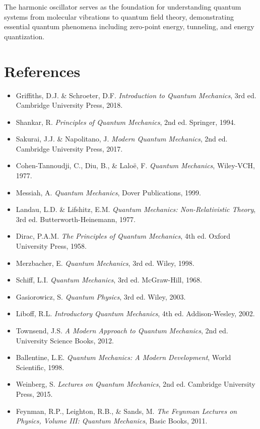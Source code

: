 \documentclass[a4paper, 11pt]{article}
\begin{document}
The harmonic oscillator serves as the foundation for understanding quantum systems from
molecular vibrations to quantum field theory, demonstrating essential quantum phenomena
including zero-point energy, tunneling, and energy quantization.

\section*{References}

\begin{itemize}
\item Griffiths, D.J. \& Schroeter, D.F. \textit{Introduction to Quantum Mechanics}, 3rd ed. Cambridge University Press, 2018.
\item Shankar, R. \textit{Principles of Quantum Mechanics}, 2nd ed. Springer, 1994.
\item Sakurai, J.J. \& Napolitano, J. \textit{Modern Quantum Mechanics}, 2nd ed. Cambridge University Press, 2017.
\item Cohen-Tannoudji, C., Diu, B., \& Laloë, F. \textit{Quantum Mechanics}, Wiley-VCH, 1977.
\item Messiah, A. \textit{Quantum Mechanics}, Dover Publications, 1999.
\item Landau, L.D. \& Lifshitz, E.M. \textit{Quantum Mechanics: Non-Relativistic Theory}, 3rd ed. Butterworth-Heinemann, 1977.
\item Dirac, P.A.M. \textit{The Principles of Quantum Mechanics}, 4th ed. Oxford University Press, 1958.
\item Merzbacher, E. \textit{Quantum Mechanics}, 3rd ed. Wiley, 1998.
\item Schiff, L.I. \textit{Quantum Mechanics}, 3rd ed. McGraw-Hill, 1968.
\item Gasiorowicz, S. \textit{Quantum Physics}, 3rd ed. Wiley, 2003.
\item Liboff, R.L. \textit{Introductory Quantum Mechanics}, 4th ed. Addison-Wesley, 2002.
\item Townsend, J.S. \textit{A Modern Approach to Quantum Mechanics}, 2nd ed. University Science Books, 2012.
\item Ballentine, L.E. \textit{Quantum Mechanics: A Modern Development}, World Scientific, 1998.
\item Weinberg, S. \textit{Lectures on Quantum Mechanics}, 2nd ed. Cambridge University Press, 2015.
\item Feynman, R.P., Leighton, R.B., \& Sands, M. \textit{The Feynman Lectures on Physics, Volume III: Quantum Mechanics}, Basic Books, 2011.
\end{itemize}
\end{document}
